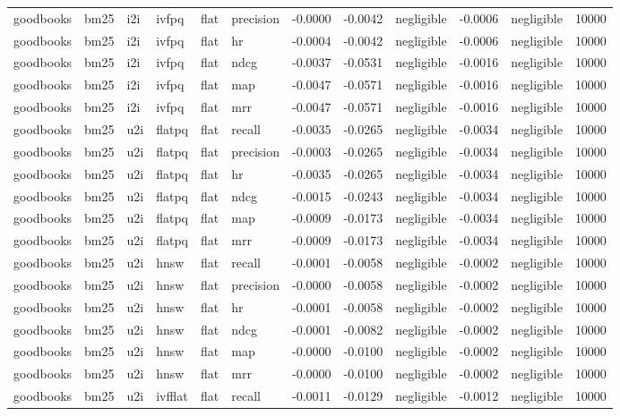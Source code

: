 \begin{tabular}{llllllrrlrlr}
goodbooks & bm25 & i2i & ivfpq & flat & precision & -0.0000 & -0.0042 & negligible & -0.0006 & negligible & 10000 \\
goodbooks & bm25 & i2i & ivfpq & flat & hr & -0.0004 & -0.0042 & negligible & -0.0006 & negligible & 10000 \\
goodbooks & bm25 & i2i & ivfpq & flat & ndcg & -0.0037 & -0.0531 & negligible & -0.0016 & negligible & 10000 \\
goodbooks & bm25 & i2i & ivfpq & flat & map & -0.0047 & -0.0571 & negligible & -0.0016 & negligible & 10000 \\
goodbooks & bm25 & i2i & ivfpq & flat & mrr & -0.0047 & -0.0571 & negligible & -0.0016 & negligible & 10000 \\
goodbooks & bm25 & u2i & flatpq & flat & recall & -0.0035 & -0.0265 & negligible & -0.0034 & negligible & 10000 \\
goodbooks & bm25 & u2i & flatpq & flat & precision & -0.0003 & -0.0265 & negligible & -0.0034 & negligible & 10000 \\
goodbooks & bm25 & u2i & flatpq & flat & hr & -0.0035 & -0.0265 & negligible & -0.0034 & negligible & 10000 \\
goodbooks & bm25 & u2i & flatpq & flat & ndcg & -0.0015 & -0.0243 & negligible & -0.0034 & negligible & 10000 \\
goodbooks & bm25 & u2i & flatpq & flat & map & -0.0009 & -0.0173 & negligible & -0.0034 & negligible & 10000 \\
goodbooks & bm25 & u2i & flatpq & flat & mrr & -0.0009 & -0.0173 & negligible & -0.0034 & negligible & 10000 \\
goodbooks & bm25 & u2i & hnsw & flat & recall & -0.0001 & -0.0058 & negligible & -0.0002 & negligible & 10000 \\
goodbooks & bm25 & u2i & hnsw & flat & precision & -0.0000 & -0.0058 & negligible & -0.0002 & negligible & 10000 \\
goodbooks & bm25 & u2i & hnsw & flat & hr & -0.0001 & -0.0058 & negligible & -0.0002 & negligible & 10000 \\
goodbooks & bm25 & u2i & hnsw & flat & ndcg & -0.0001 & -0.0082 & negligible & -0.0002 & negligible & 10000 \\
goodbooks & bm25 & u2i & hnsw & flat & map & -0.0000 & -0.0100 & negligible & -0.0002 & negligible & 10000 \\
goodbooks & bm25 & u2i & hnsw & flat & mrr & -0.0000 & -0.0100 & negligible & -0.0002 & negligible & 10000 \\
goodbooks & bm25 & u2i & ivfflat & flat & recall & -0.0011 & -0.0129 & negligible & -0.0012 & negligible & 10000 \\

\end{tabular}
